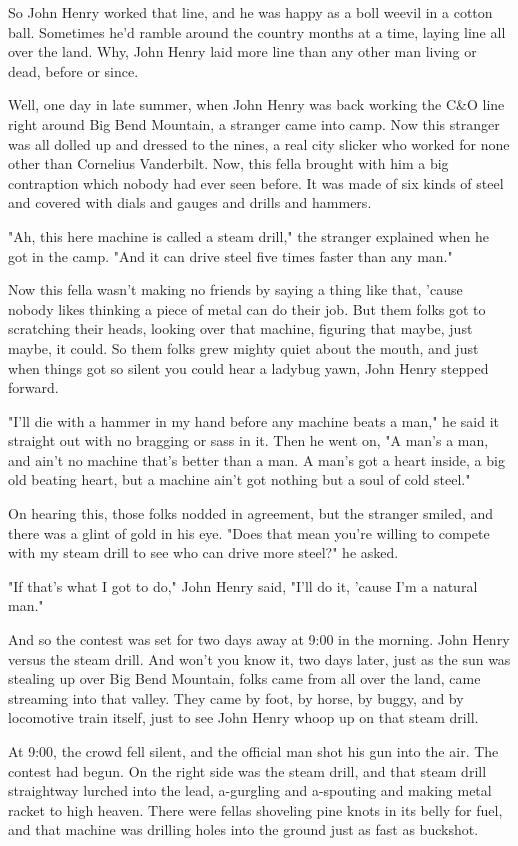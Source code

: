 So John Henry worked that line, and he was happy as a boll weevil in a cotton ball. Sometimes he'd ramble around the country months at a time, laying line all over the land. Why, John Henry laid more line than any other man living or dead, before or since.

Well, one day in late summer, when John Henry was back working the C\&O line right around Big Bend Mountain, a stranger came into camp. Now this stranger was all dolled up and dressed to the nines, a real city slicker who worked for none other than Cornelius Vanderbilt. Now, this fella brought with him a big contraption which nobody had ever seen before. It was made of six kinds of steel and covered with dials and gauges and drills and hammers.

"Ah, this here machine is called a steam drill," the stranger explained when he got in the camp. "And it can drive steel five times faster than any man."

Now this fella wasn't making no friends by saying a thing like that, 'cause nobody likes thinking a piece of metal can do their job. But them folks got to scratching their heads, looking over that machine, figuring that maybe, just maybe, it could. So them folks grew mighty quiet about the mouth, and just when things got so silent you could hear a ladybug yawn, John Henry stepped forward.

"I'll die with a hammer in my hand before any machine beats a man," he said it straight out with no bragging or sass in it. Then he went on, "A man's a man, and ain't no machine that's better than a man. A man's got a heart inside, a big old beating heart, but a machine ain't got nothing but a soul of cold steel."

On hearing this, those folks nodded in agreement, but the stranger smiled, and there was a glint of gold in his eye. "Does that mean you're willing to compete with my steam drill to see who can drive more steel?" he asked.

"If that's what I got to do," John Henry said, "I'll do it, 'cause I'm a natural man."

And so the contest was set for two days away at 9:00 in the morning. John Henry versus the steam drill. And won't you know it, two days later, just as the sun was stealing up over Big Bend Mountain, folks came from all over the land, came streaming into that valley. They came by foot, by horse, by buggy, and by locomotive train itself, just to see John Henry whoop up on that steam drill.

At 9:00, the crowd fell silent, and the official man shot his gun into the air. The contest had begun. On the right side was the steam drill, and that steam drill straightway lurched into the lead, a-gurgling and a-spouting and making metal racket to high heaven. There were fellas shoveling pine knots in its belly for fuel, and that machine was drilling holes into the ground just as fast as buckshot.

